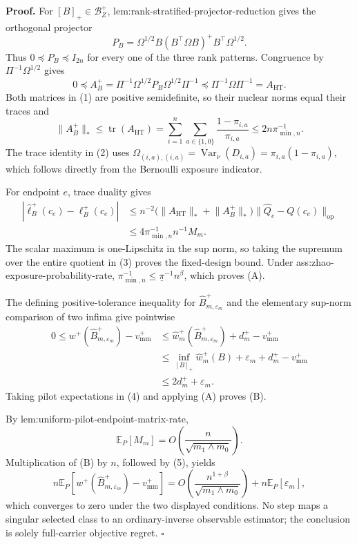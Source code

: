 \textbf{Proof.}
For \([B]_+\in\mathcal B_Z^+\), lem:rank-stratified-projector-reduction gives the orthogonal projector
\[
 P_B=\Omega^{1/2}B(B^{\top}\Omega B)^+B^{\top}\Omega^{1/2}.
\]
Thus \(0\preceq P_B\preceq I_{2n}\) for every one of the three rank patterns.  Congruence by \(\Pi^{-1}\Omega^{1/2}\) gives
\[
 0\preceq
 A_B^+=\Pi^{-1}\Omega^{1/2}P_B\Omega^{1/2}\Pi^{-1}
 \preceq
 \Pi^{-1}\Omega\Pi^{-1}=A_{\mathrm{HT}}.
\tag{1}
\]
Both matrices in (1) are positive semidefinite, so their nuclear norms equal their traces and
\[
 \lVert A_B^+\rVert_*
 \le\operatorname{tr}(A_{\mathrm{HT}})
 =\sum_{i=1}^n\sum_{a\in\{1,0\}}
 \frac{1-\pi_{i,a}}{\pi_{i,a}}
 \le2n\pi_{\min,n}^{-1}.
\tag{2}
\]
The trace identity in (2) uses
\(
 \Omega_{(i,a),(i,a)}=\operatorname{Var}_\nu(D_{i,a})
 =\pi_{i,a}(1-\pi_{i,a})
\),
which follows directly from the Bernoulli exposure indicator.

For endpoint \(e\), trace duality gives
\[
 \begin{aligned}
 |\widehat\ell_B^+(c_e)-\ell_B^+(c_e)|
 &\le n^{-2}\bigl(
 \lVert A_{\mathrm{HT}}\rVert_*+\lVert A_B^+\rVert_*
 \bigr)
 \lVert\widehat Q_e-Q(c_e)\rVert_{\mathrm{op}}\\
 &\le4\pi_{\min,n}^{-1}n^{-1}M_m.
 \end{aligned}
\tag{3}
\]
The scalar maximum is one-Lipschitz in the sup norm, so taking the supremum over the entire quotient in (3) proves the fixed-design bound.  Under ass:zhao-exposure-probability-rate,
\(
 \pi_{\min,n}^{-1}\le\underline\pi^{-1}n^\beta
\),
which proves (A).

The defining positive-tolerance inequality for \(\widehat B_{m,\varepsilon_m}^+\) and the elementary sup-norm comparison of two infima give pointwise
\[
 \begin{aligned}
 0\le w^+(\widehat B_{m,\varepsilon_m}^+)-v_{\mathrm{mm}}^+
 &\le
 \widehat w_m^+(\widehat B_{m,\varepsilon_m}^+)+d_m^+-v_{\mathrm{mm}}^+\\
 &\le
 \inf_{[B]_+}\widehat w_m^+(B)+\varepsilon_m+d_m^+-v_{\mathrm{mm}}^+\\
 &\le2d_m^++\varepsilon_m.
 \end{aligned}
\tag{4}
\]
Taking pilot expectations in (4) and applying (A) proves (B).

By lem:uniform-pilot-endpoint-matrix-rate,
\[
 \mathbb E_P[M_m]
 =O\!\left(\frac{n}{\sqrt{m_1\wedge m_0}}\right).
\tag{5}
\]
Multiplication of (B) by \(n\), followed by (5), yields
\[
 n\mathbb E_P\!\left[
 w^+(\widehat B_{m,\varepsilon_m}^+)-v_{\mathrm{mm}}^+
 \right]
 =O\!\left(
 \frac{n^{1+\beta}}{\sqrt{m_1\wedge m_0}}
 \right)+n\mathbb E_P[\varepsilon_m],
\]
which converges to zero under the two displayed conditions.  No step maps a singular selected class to an ordinary-inverse observable estimator; the conclusion is solely full-carrier objective regret. \(\square\)